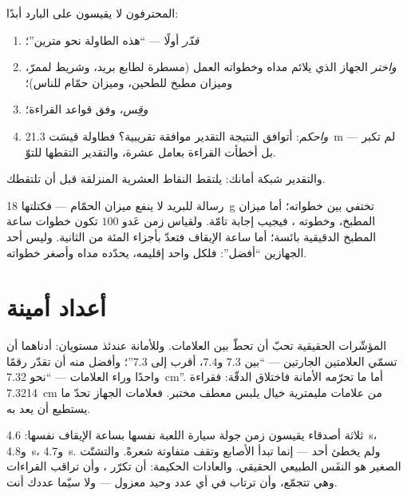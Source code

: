 \begin{method}[قدّر، ثم قِس، ثم احكم]\label{met:g6:measurement-in-science:estimate}
المحترفون لا يقيسون على البارد أبدًا:
\begin{enumerate}
  \item \emph{قدّر} أولًا --- ``هذه الطاولة نحو مترين''؛
  \item \emph{واختر} الجهاز الذي يلائم مداه وخطواته العمل
        (مسطرة لطابع بريد، وشريط  لممرّ، وميزان مطبخ
        للطحين، وميزان حمّام للناس)؛
  \item \emph{وقِس}، وفق قواعد القراءة؛
  \item \emph{واحكم}: أتوافق النتيجة التقدير موافقة تقريبية؟
        فطاولة قيسَت \qty{21.3}{m} لم تكبر --- بل أخطأت القراءة
        بعامل عشرة، والتقدير التقطها للتوّ.
\end{enumerate}
والتقدير شبكة أمانك: يلتقط النقاط العشرية المنزلقة قبل أن
تلتقطك.
\end{method}

\begin{example}\label{ex:g6:measurement-in-science:choose}
 رسالة للبريد لا ينفع ميزان الحمّام --- فكتلتها \qty{18}{g} تختفي
بين خطواته؛ أما ميزان المطبخ، وخطوته ، فيجيب إجابة تامّة.
ولقياس زمن عَدو $100$  تكون خطوات ساعة المطبخ الدقيقية بائسة؛
أما ساعة الإيقاف فتعدّ بأجزاء المئة من الثانية. وليس أحد
الجهازين ``أفضل'': فلكل واحد إقليمه، يحدّده مداه وأصغر خطواته.
\end{example}

\section{أعداد أمينة}

\begin{remark}\label{rem:g6:measurement-in-science:between}
المؤشّرات الحقيقية تحبّ أن تحطّ بين العلامات. وللأمانة عندئذ
مستويان: أدناهما أن تسمّي العلامتين الجارتين --- ``بين $7.3$
و$7.4$، أقرب إلى $7.3$''؛ وأفضل منه أن تقدّر رقمًا واحدًا وراء
العلامات --- ``نحو \qty{7.32}{cm}''. أما ما تحرّمه الأمانة
فاختلاق الدقّة: فقراءة \qty{7.3214}{cm} من علامات مليمترية خيال
يلبس معطف مختبر. فعلامات الجهاز تحدّ ما يستطيع أن يعد به.
\end{remark}

\begin{example}\label{ex:g6:measurement-in-science:repeat}
ثلاثة أصدقاء يقيسون زمن جولة سيارة اللعبة نفسها بساعة الإيقاف
نفسها: \qty{4.6}{s}، و\qty{4.8}{s}، و\qty{4.7}{s}. ولم يخطئ
أحد --- إنما تبدأ الأصابع وتقف متفاوتة شعرةً. والتشتّت الصغير
هو النفَس الطبيعي  الحقيقي. والعادات الحكيمة: أن تكرّر
، وأن تراقب القراءات وهي تتجمّع، وأن ترتاب في أي عدد وحيد
معزول --- ولا سيّما عددك أنت.
\end{example}

